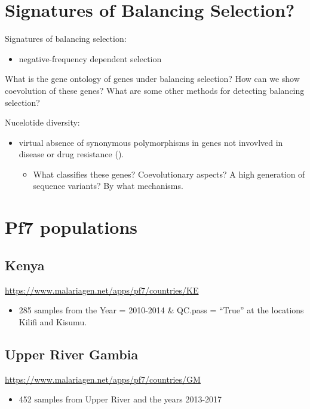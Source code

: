 \documentclass[11pt]{article}
\begin{document}
\section{Signatures of Balancing Selection?}
\label{sec:orgb42e4da}
Signatures of balancing selection:
\begin{itemize}
\item negative-frequency dependent selection
\end{itemize}

What is the gene ontology of genes under balancing selection? How can we show coevolution of these genes? What are some other methods for detecting balancing selection?

Nucelotide diversity:
\begin{itemize}
\item virtual absence of synonymous polymorphisms in genes not invovlved in disease or drug resistance (\cite{rich-2000-popul-struc}).
\begin{itemize}
\item What classifies these genes? Coevolutionary aspects? A high generation of sequence variants? By what mechanisms.
\end{itemize}
\end{itemize}

\section{Pf7 populations}
\label{sec:org2a47976}
\subsection{Kenya}
\label{sec:org99d87bc}
\url{https://www.malariagen.net/apps/pf7/countries/KE}
\begin{itemize}
\item 285 samples from the Year = 2010-2014 \& QC.pass = ``True'' at the locations Kilifi and Kisumu.
\end{itemize}

\subsection{Upper River Gambia}
\label{sec:orgcde26b5}
\url{https://www.malariagen.net/apps/pf7/countries/GM}
\begin{itemize}
\item 452 samples from Upper River and the years 2013-2017
\end{itemize}
\end{document}
